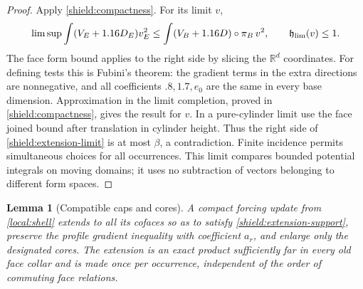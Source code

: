 \documentclass[11pt]{article}
\numberwithin{equation}{section}
\newtheorem{lemma}[theorem]{Lemma}
\theoremstyle{definition}
\theoremstyle{remark}
\begin{document}
\begin{proof}
Apply \cref{shield:compactness}.  For its limit $v$,
\begin{equation}\label{shield:extension-limit}
 \limsup\int(V_E+1.16D_E)v_E^2
 \le\int(V_B+1.16D)\circ\pi_B\,v^2,
 \qquad \mathfrak h_{\rm lim}(v)\le1.
\end{equation}
The face form bound applies to the right side by slicing the $\mathbb R^d$
coordinates.  For defining tests this is Fubini's theorem: the gradient
terms in the extra directions are nonnegative, and all coefficients
$.8,1.7,e_0$ are the same in every base dimension.  Approximation in the
limit completion, proved in \cref{shield:compactness}, gives the result
for $v$.  In a pure-cylinder limit use the face joined bound after
translation in cylinder height.  Thus the right side of
\cref{shield:extension-limit} is at most $\beta$, a contradiction.
Finite incidence permits simultaneous choices for all occurrences.
This limit compares bounded potential integrals on moving domains;
it uses no subtraction of vectors belonging to different form spaces.
\end{proof}

\begin{lemma}[Compatible caps and cores]\label{shield:caps}
A compact forcing update from \cref{local:shell} extends to all its
cofaces so as to satisfy \cref{shield:extension-support}, preserve the
profile gradient inequality with coefficient $a_r$, and enlarge only
the designated cores.  The extension is an exact product sufficiently
far in every old face collar and is made once per occurrence, independent
of the order of commuting face relations.
\end{lemma}
\end{document}
